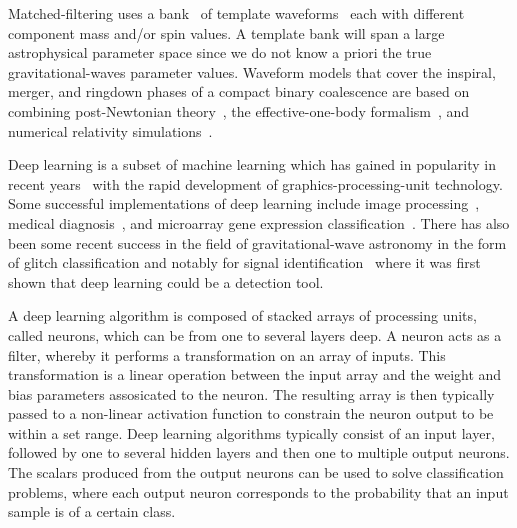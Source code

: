 \documentclass[%
showpacs,
 amsmath,amssymb,
 aps,
 twocolumn,
 prl,
 reprint,
floatfix,
]{revtex4-1}
\begin{document}
%
%
Matched-filtering uses a bank~\cite{PhysRevD.86.084017,
1705.01845,PhysRevD.80.104014, PhysRevD.90.082004, PhysRevD.89.084041} of
template waveforms~\cite{PhysRevD.44.3819, PhysRevD.89.061502,
PhysRevD.89.024003, Blanchet2014} each with different component mass
and/or spin values. A template bank will span a large astrophysical parameter
space since we do not know a priori the true gravitational-waves parameter
values. Waveform models that cover the inspiral, merger, and ringdown phases of
a compact binary coalescence are based on combining post-Newtonian
theory~\cite{PhysRevD.84.049901,PhysRevD.80.084043,Blanchet2014,PhysRevD.93.084054},
the effective-one-body formalism~\cite{PhysRevD.59.084006}, and numerical
relativity simulations~\cite{PhysRevLett.95.121101}.

%
%
Deep learning is a subset of machine learning which has gained in popularity in
recent years~\cite{NIPS2012_4824, 1406.2661, 1409.1556, 1412.7062, 1311.2901,
1409.4842} with the rapid development of graphics-processing-unit technology.
Some successful implementations of deep learning include image processing~\cite{1603.08511,1412.2306,NIPS2012_4824}, medical
diagnosis~\cite{KONONENKO200189}, and microarray gene expression
classification~\cite{Pirooznia2008}. There has also been
some recent success in the field of gravitational-wave astronomy in the form of
glitch classification \cite{PhysRevD.95.104059,
0264-9381-34-6-064003,1706.07446} and notably for signal
identification~\cite{1701.00008} where it was first shown that deep learning
could be a detection tool. 

%
%
A deep learning algorithm is composed of stacked arrays of processing units,
called neurons, which can be from one to several layers deep. A neuron
acts as a filter, whereby it performs a transformation on an array of inputs.
This transformation is a linear operation between the input array and the
weight and bias parameters assosicated to the neuron. The resulting array is
then typically passed to a non-linear activation function to constrain the
neuron output to be within a set range. Deep learning algorithms typically
consist of an input layer, followed by one to several hidden layers and then
one to multiple output neurons. The scalars produced from the output neurons
can be used to solve classification problems, where each output neuron
corresponds to the probability that an input sample is of a certain
class.
\end{document}
